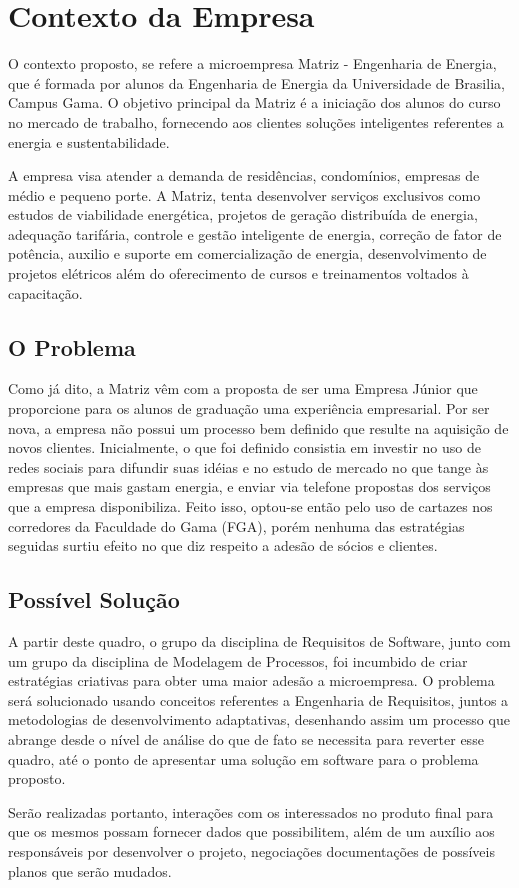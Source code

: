 \chapter[Contexto da Empresa]{Contexto da Empresa}
O contexto proposto, se refere a microempresa Matriz - Engenharia de Energia, que é formada por alunos da Engenharia de Energia da Universidade de Brasilia, Campus Gama. O objetivo principal da Matriz é a iniciação dos alunos do curso no mercado de trabalho, fornecendo aos clientes soluções inteligentes referentes a energia e sustentabilidade.

A empresa visa atender a demanda de residências, condomínios, empresas de médio e pequeno porte. A Matriz, tenta desenvolver serviços exclusivos como estudos de viabilidade energética, projetos de geração distribuída de energia, adequação tarifária, controle e gestão inteligente de energia, correção de fator de potência, auxilio e suporte em comercialização de energia, desenvolvimento de projetos elétricos além do oferecimento de cursos e treinamentos voltados à capacitação.

\section{O Problema}
Como já dito, a Matriz vêm com a proposta de ser uma Empresa Júnior que proporcione para os alunos de graduação uma experiência empresarial. Por ser nova, a empresa não possui um processo bem definido que resulte na aquisição de novos clientes. Inicialmente, o que foi definido consistia em investir no uso de redes sociais para difundir suas idéias e no estudo de mercado no que tange às empresas que mais gastam energia, e enviar via telefone propostas dos serviços que a empresa disponibiliza. Feito isso, optou-se então pelo uso de cartazes nos corredores da Faculdade do Gama (FGA), porém nenhuma das estratégias seguidas surtiu efeito no que diz respeito a adesão de sócios e clientes.

\section{Possível Solução}
A partir deste quadro, o grupo da disciplina de Requisitos de Software, junto com um grupo da disciplina de Modelagem de Processos, foi incumbido de criar estratégias criativas para obter uma maior adesão a microempresa. O problema será solucionado usando conceitos referentes a Engenharia de Requisitos, juntos a metodologias de desenvolvimento adaptativas, desenhando assim um processo que abrange desde o nível de análise do que de fato se necessita para reverter esse quadro, até o ponto de apresentar uma solução em software para o problema proposto.

Serão realizadas portanto, interações com os interessados no produto final para que os mesmos possam fornecer dados que possibilitem, além de um auxílio aos responsáveis por desenvolver o projeto, negociações documentações de possíveis planos que serão mudados.
